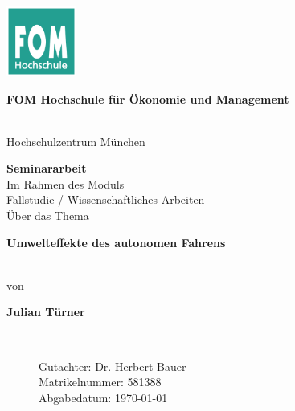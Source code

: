 \newcommand{\Thema}{Umwelteffekte des autonomen Fahrens}
\newcommand{\Name}{Julian Türner}
\newcommand{\Gutachter}{Dr. Herbert Bauer}
\newcommand{\Matrikelnummer}{581388}
\newcommand{\Abgabedatum}{\today}




\begin{titlepage}
	\begin{center}
		\includegraphics[width=2.3cm]{assets/fomLogo.pdf}\\
		\vspace{.5cm}
		\begin{Large}\textbf{FOM Hochschule für Ökonomie und Management}\end{Large}\\
		\vspace{.5cm}
		Hochschulzentrum München

		\vspace{2cm}
	\end{center}

	\bigskip

	\begin{center}
		\textbf{Seminararbeit}\\
		\vspace{0.2cm}
		Im Rahmen des Moduls\\
		\vspace{0.5cm}
		Fallstudie / Wissenschaftliches Arbeiten\\
		\vspace{2cm}
		Über das Thema\\
		\vspace{0.5cm}
		\begin{Large}\textbf{\textbf{\Thema}}\end{Large}\\

		\vspace{2cm}
		von\\
		\vspace{0.5cm}
		\begin{Large}\textbf{\textbf{\Name}}\end{Large}\\
	\end{center}

	\begin{figure}[b]

		Gutachter: \Gutachter       \\
		Matrikelnummer: \Matrikelnummer \\
		Abgabedatum: \Abgabedatum
	\end{figure}

\end{titlepage}
